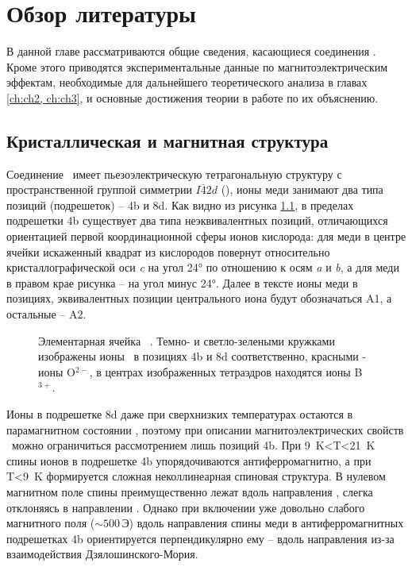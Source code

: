 \chapter{Обзор литературы}\label{ch:ch1}

В данной главе рассматриваются общие сведения, касающиеся соединения \cbo. Кроме этого приводятся экспериментальные данные по магнитоэлектрическим эффектам, необходимые для дальнейшего теоретического анализа в главах \cref{ch:ch2, ch:ch3}, и основные достижения теории в работе по их объяснению.

\section{Кристаллическая и магнитная структура \cbo}\label{sec:ch1/sec1}

Соединение \cbo\ имеет пьезоэлектрическую тетрагональную структуру с пространственной группой симметрии \(I\overline{4}2d\) (), ионы меди занимают два типа позиций (подрешеток) – 4b и 8d. Как видно из рисунка \cref{fig:unit-cell}, в пределах подрешетки 4b существует два типа неэквивалентных позиций, отличающихся ориентацией первой координационной сферы ионов кислорода: для меди в центре ячейки искаженный квадрат из кислородов повернут относительно кристаллографической оси \emph{c} на угол \ang{24} по отношению к осям \emph{a} и \emph{b}, а для меди в правом крае рисунка -- на угол минус \ang{24}. Далее в тексте ионы меди в позициях, эквивалентных позиции центрального иона будут обозначаться A1, а остальные -- A2.

\begin{figure}[ht]
	\caption{Элементарная ячейка \cbo\ \cite{Martinez1971}. Темно- и светло-зелеными кружками изображены ионы \cu\ в позициях 4b и 8d соответственно, красными - ионы O\(^{2-}\), в центрах изображенных тетраэдров находятся ионы B\(^{3+}\). }
	\label{fig:unit-cell}
\end{figure}

Ионы в подрешетке 8d даже при сверхнизких температурах остаются в парамагнитном состоянии \cite{Boehm2003}, поэтому при описании магнитоэлектрических свойств \cbo\ можно ограничиться рассмотрением лишь позиций 4b. При \SI{9}{\kelvin}<T<\SI{21}{\kelvin} спины ионов в подрешетке 4b  упорядочиваются антиферромагнитно, а при T<\SI{9}{\kelvin} формируется сложная неколлинеарная спиновая структура.  В нулевом магнитном поле спины преимущественно лежат вдоль направления , слегка отклоняясь в направлении  \cite{Boehm2003}. Однако при включении уже довольно слабого магнитного поля (\({\sim}500\,\)Э) вдоль направления  спины меди в антиферромагнитных подрешетках 4b ориентируется перпендикулярно ему – вдоль направления  \cite{Toyoda2019} из-за взаимодействия Дзялошинского-Мория.

